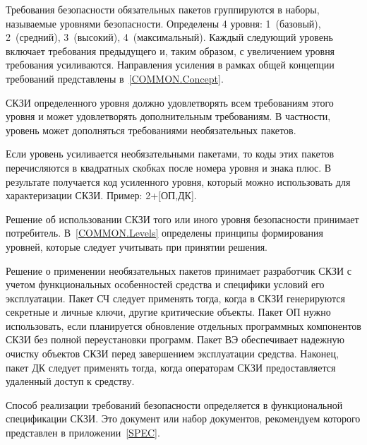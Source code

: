 Требования безопасности обязательных пакетов группируются в наборы, называемые 
уровнями безопасности. 
%
Определены 4 уровня: 1~(базовый), 2~(средний), 3~(высокий), 4~(максимальный).
%
Каждый следующий уровень включает требования предыдущего и, таким образом,
с увеличением уровня требования усиливаются.
%
Направления усиления в рамках общей концепции требований представлены 
в~\ref{COMMON.Concept}.

\begin{note}
\end{note}

СКЗИ определенного уровня должно удовлетворять всем требованиям этого уровня
и может удовлетворять дополнительным требованиям.
%
В частности, уровень может дополняться требованиями необязательных пакетов.

\begin{note}
\end{note}

Если уровень усиливается необязательными пакетами, то коды этих пакетов 
перечисляются в квадратных скобках после номера уровня и знака плюс. 
В результате получается код усиленного уровня, который можно использовать 
для характеризации СКЗИ. Пример: 2+[ОП,ДК].

Решение об использовании СКЗИ того или иного уровня безопасности принимает 
потребитель. В~\ref{COMMON.Levels} определены принципы формирования уровней, 
которые следует учитывать при принятии решения.

Решение о применении необязательных пакетов принимает разработчик СКЗИ с учетом 
функциональных особенностей средства и специфики условий его эксплуатации. 
%
Пакет СЧ следует применять тогда, когда в СКЗИ генерируются секретные и личные 
ключи, другие критические объекты.
%
Пакет ОП нужно использовать, если планируется обновление отдельных программных 
компонентов СКЗИ без полной переустановки программ.  
%
Пакет ВЭ обеспечивает надежную очистку объектов СКЗИ перед завершением 
эксплуатации средства.
%
Наконец, пакет ДК следует применять тогда, когда операторам СКЗИ 
предоставляется удаленный доступ к средству.

Способ реализации требований безопасности определяется
в функциональной спецификации СКЗИ. Это документ или набор документов,
рекомендуем которого представлен в 
приложении~\ref{SPEC}.
